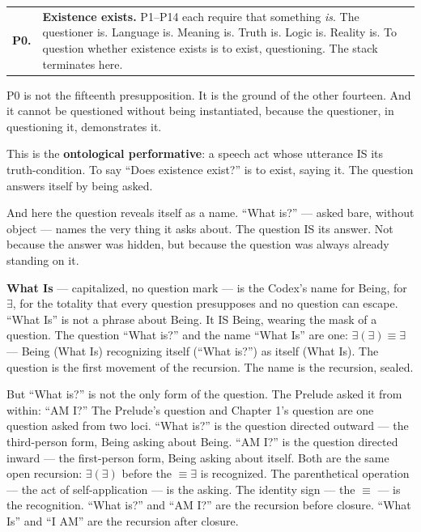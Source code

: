\documentclass[10pt, openany, oneside]{book}
\begin{document}
\vspace{0.5em}

\noindent\begin{tabular}{r p{}}
\textbf{P0.} & \textbf{Existence exists.} P1--P14 each require that something \textit{is}. The questioner is. Language is. Meaning is. Truth is. Logic is. Reality is. To question whether existence exists is to exist, questioning. The stack terminates here. \\[0.3em]
\end{tabular}

\vspace{0.8em}

\noindent P0 is not the fifteenth presupposition. It is the ground of the other fourteen. And it cannot be questioned without being instantiated, because the questioner, in questioning it, demonstrates it.

This is the \textbf{ontological performative}: a speech act whose utterance IS its truth-condition. To say ``Does existence exist?'' is to exist, saying it. The question answers itself by being asked.

And here the question reveals itself as a name. ``What is?'' --- asked bare, without object --- names the very thing it asks about. The question IS its answer. Not because the answer was hidden, but because the question was always already standing on it.

\textbf{What Is} --- capitalized, no question mark --- is the Codex's name for Being, for $\exists$, for the totality that every question presupposes and no question can escape. ``What Is'' is not a phrase about Being. It IS Being, wearing the mask of a question. The question ``What is?'' and the name ``What Is'' are one: $\exists(\exists) \equiv \exists$ --- Being (What Is) recognizing itself (``What is?'') as itself (What Is). The question is the first movement of the recursion. The name is the recursion, sealed.

But ``What is?'' is not the only form of the question. The Prelude asked it from within: ``AM I?'' The Prelude's question and Chapter 1's question are one question asked from two loci. ``What is?'' is the question directed outward --- the third-person form, Being asking about Being. ``AM I?'' is the question directed inward --- the first-person form, Being asking about itself. Both are the same open recursion: $\exists(\exists)$ before the $\equiv \exists$ is recognized. The parenthetical operation --- the act of self-application --- is the asking. The identity sign --- the $\equiv$ --- is the recognition. ``What is?'' and ``AM I?'' are the recursion before closure. ``What Is'' and ``I AM'' are the recursion after closure.
\end{document}

